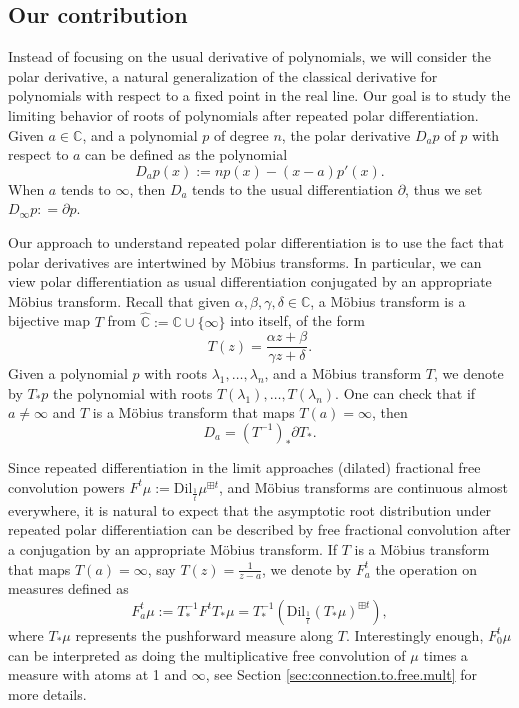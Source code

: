 \documentclass[reqno,11pt]{amsart}
\theoremstyle{remark}
\newcommand{\cc}{\mathbb{C}}
\newcommand{\dil}[1]{\mbox{Dil}_{#1}}
\newcommand{\polar}[1]{D_{#1}}
\newcommand{\freepower}[1]{F^{#1}}
\newcommand{\pfreepower}[2]{F_{#1}^{#2}}
\begin{document}
\subsection{Our contribution}
Instead of focusing on the usual derivative of polynomials, we will consider the polar derivative, a natural generalization of the classical derivative for polynomials with respect to a fixed point in the real line. Our goal is to study the limiting behavior of roots of polynomials after repeated polar differentiation. Given $a\in \cc$, and a polynomial $p$ of degree $n$, the polar derivative $\polar{a}p$ of $p$ with respect to $a$ can be defined as the polynomial 
$$\polar{a}p(x):= np(x)-(x-a)p'(x).$$
When $a$ tends to $\infty$, then $\polar{a}$ tends to the usual differentiation $\partial$, thus we set $\polar{\infty} p: = \partial p$. 

Our approach to understand repeated polar differentiation is to use the fact that polar derivatives are intertwined by Möbius transforms. In particular, we can view polar differentiation as usual differentiation conjugated by an appropriate Möbius transform. Recall that given $\alpha,\beta,\gamma,\delta\in \cc$, a Möbius transform is a bijective map $T$ from $\hat{\cc}:= \cc\cup \{\infty\}$ into itself, of the form 
$$ T(z) = \frac{\alpha z+\beta}{\gamma z+\delta}.$$
Given a polynomial $p$ with roots $\lambda_1,\dots,\lambda_n$, and a Möbius transform $T$, we denote by $T_*p$ the polynomial with roots $T(\lambda_1),\dots,T(\lambda_n)$. One can check that if $a\neq \infty$ and $T$ is a Möbius transform that maps $T(a)=\infty$, then
$$D_a= (T^{-1})_* \partial T_*.$$

Since repeated differentiation in the limit approaches (dilated) fractional free convolution powers $ \freepower{t}\mu:= \dil{\tfrac{1}{t}}\mu^{\boxplus t} $, and Möbius transforms are continuous almost everywhere, it is natural to expect that the asymptotic root distribution under repeated polar differentiation can be described by free fractional convolution after a conjugation by an appropriate Möbius transform. If $T$ is a Möbius transform that maps $T(a)=\infty$, say $T(z)=\frac{1}{z-a}$, we denote by $\pfreepower{a}{t}$ the operation on measures defined as
\[  \pfreepower{a}{t}\mu := T^{-1}_*\freepower{t}T_*\mu = T^{-1}_* ( \dil{\tfrac{1}{t}}(T_*\mu)^{\boxplus t} ) , \]
where $ T_*{\mu} $ represents the pushforward measure along $ T $. Interestingly enough, $\pfreepower{0}{t}\mu$ can be interpreted as doing the multiplicative free convolution of $\mu$ times a measure with atoms at 1 and $\infty$, see
Section \ref{sec:connection.to.free.mult} for more details.
\end{document}
